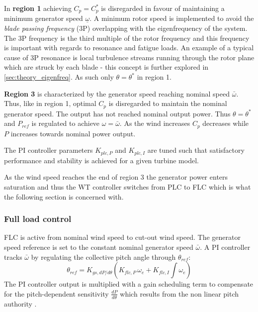 In \textbf{region 1} achieving $ C_p = C_p^* $ is disregarded in favour of maintaining a minimum generator speed $ \underline{\omega} $. A minimum rotor speed is implemented to avoid the \textit{blade passing frequency} (3P) overlapping with the eigenfrequency of the system. The 3P frequency is the third multiple of the rotor frequency and this frequency is important with regards to resonance and fatigue loads. An example of a typical cause of 3P resonance is local turbulence streams running through the rotor plane which are struck by each blade - this concept is further explored in \cref{sec:theory_eigenfreq}. As such only $ \theta = \theta^* $ in region 1.

\textbf{Region 3} is characterized by the generator speed reaching nominal speed $ \bar{\omega} $. Thus, like in region 1, optimal $ C_p $ is disregarded to maintain the nominal generator speed. The output  has not reached nominal output power. Thus $ \theta = \theta^* $ and $ P_{ref} $ is regulated to achieve $ \omega = \bar{\omega} $. As the wind increases $ C_p $ decreases while $ P $ increases towards nominal power output. 

The PI controller parameters $ K_{plc,P} $ and $ K_{plc,I} $ are tuned such that satisfactory performance and stability is achieved for a given turbine model. 

As the wind speed reaches the end of region 3 the generator power enters saturation and thus the WT controller switches from PLC to FLC which is what the following section is concerned with.


\subsubsection{Full load control} \label{sec:theory_ctrl_flc}
FLC is active from nominal wind speed to cut-out wind speed. The generator speed reference is set to the constant nominal generator speed $ \bar{\omega} $. A PI controller tracks $ \bar{\omega} $ by regulating the collective pitch angle through $ \theta_{ref} $:
\begin{equation}\label{eq:pi_flc_ctrl}
	\theta_{ref} = K_{gs,dP/d\theta} \left(K_{flc,P} \, \omega_e + K_{flc,I} \int \omega_e\right)
\end{equation}
The PI controller output is multiplied with a gain scheduling term to compensate for the pitch-dependent sensitivity $ \frac{dP}{d\theta} $ which results from the non linear pitch authority \cite{Pao2009}. 

